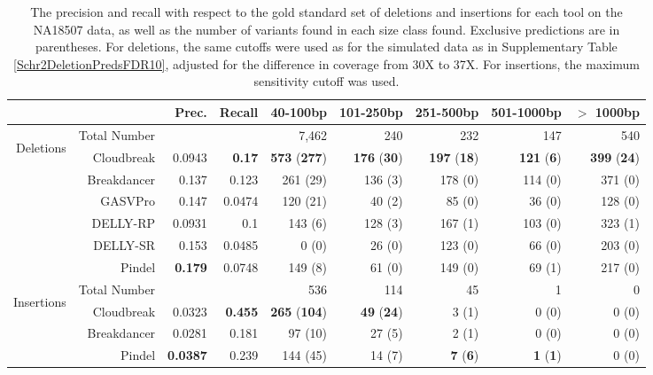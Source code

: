 \documentclass[11pt]{article}
\begin{document}
\begin{table}
\begin{center}
\begin{tabular}{r|rrr|rrrrr}
  \cline{2-9}
&  & Prec. & Recall & 40-100bp & 101-250bp & 251-500bp & 501-1000bp & $>$ 1000bp \\ 
\hline
\multirow{6}{*}{\begin{sideways}Deletions\end{sideways}} & Total Number & & & 7,462 & 240 & 232 & 147 & 540 \\
  \hline
\cline{2-9}
& Cloudbreak & 0.0943 & \textbf{0.17} & \textbf{573} (\textbf{277})  & \textbf{176} (\textbf{30}) &  \textbf{197} (\textbf{18}) & \textbf{121} (\textbf{6}) & \textbf{399} (\textbf{24}) \\ 
& Breakdancer & 0.137 & 0.123 & 261 (29)  & 136 (3) &  178 (0) & 114 (0) & 371 (0) \\  
&  GASVPro & 0.147 & 0.0474 & 120 (21)  & 40 (2) &  85 (0) & 36 (0) & 128 (0) \\ 
&  DELLY-RP & 0.0931 & 0.1 & 143 (6)  & 128 (3) &  167 (1) & 103 (0) & 323 (1) \\ 
&  DELLY-SR & 0.153 & 0.0485 & 0 (0)  & 26 (0) &  123 (0) & 66 (0) & 203 (0) \\ 
&  Pindel & \textbf{0.179} & 0.0748 & 149 (8)  & 61 (0) &  149 (0) & 69 (1) & 217 (0) \\ 
\hline
\multirow{4}{*}{\begin{sideways}Insertions\end{sideways}} & Total Number & & & 536 & 114 & 45 & 1 & 0 \\
\cline{2-9}
& Cloudbreak & 0.0323 & \textbf{0.455} & \textbf{265} (\textbf{104})  & \textbf{49} (\textbf{24}) &  3 (1) & 0 (0)  & 0 (0)  \\ 
& Breakdancer & 0.0281 & 0.181 & 97 (10)  & 27 (5) &  2 (1) & 0 (0) & 0 (0) \\  
&  Pindel & \textbf{0.0387} & 0.239 & 144 (45)  & 14 (7) &  \textbf{7} (\textbf{6}) & \textbf{1} (\textbf{1}) &  0 (0) \\ 
\hline
\end{tabular}
\end{center}
\caption{The precision and recall with respect to the gold standard set of deletions and insertions for each tool on the NA18507 data, as well as the number of variants found in each size class found. Exclusive predictions are in parentheses. For deletions, the same cutoffs were used as for the simulated data as in Supplementary Table \ref{Schr2DeletionPredsFDR10}, adjusted for the difference in coverage from 30X to 37X. For insertions, the maximum sensitivity cutoff was used.}
\label{NA18507DeletionAndInsertionPreds}
\end{table}
\end{document}
